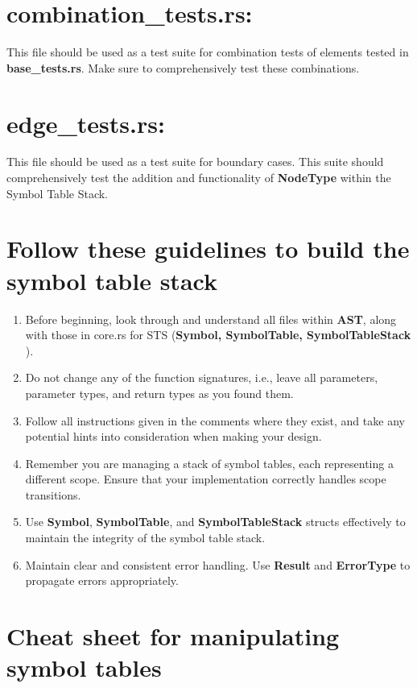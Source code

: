 \documentclass[
	12pt, %
]{fphw}
\begin{document}
\section*{combination\_tests.rs:}
This file should be used as a test suite for combination tests of elements tested in \textbf{base\_tests.rs}. Make sure to comprehensively test these combinations. 

\section*{edge\_tests.rs:}
This file should be used as a test suite for boundary cases. This suite should comprehensively test the addition and functionality of \textbf{NodeType} within the Symbol Table Stack. 

\pagebreak

\section*{Follow these guidelines to build the symbol table stack}

\begin{problem}
    \begin{enumerate}
        \item Before beginning, look through and understand all files within \textbf{AST}, along with those in core.rs for STS (\textbf{Symbol, SymbolTable, SymbolTableStack} ).
        \item Do not change any of the function signatures, i.e., leave all parameters, parameter types, and return types as you found them.
        \item Follow all instructions given in the comments where they exist, and take any potential hints into consideration when making your design.
        \item Remember you are managing a stack of symbol tables, each representing a different scope. Ensure that your implementation correctly handles scope transitions.
        \item Use \textbf{Symbol}, \textbf{SymbolTable}, and \textbf{SymbolTableStack} structs effectively to maintain the integrity of the symbol table stack.
        \item Maintain clear and consistent error handling. Use \textbf{Result} and \textbf{ErrorType} to propagate errors appropriately.
    \end{enumerate}
\end{problem}

\section*{Cheat sheet for manipulating symbol tables}
\end{document}
